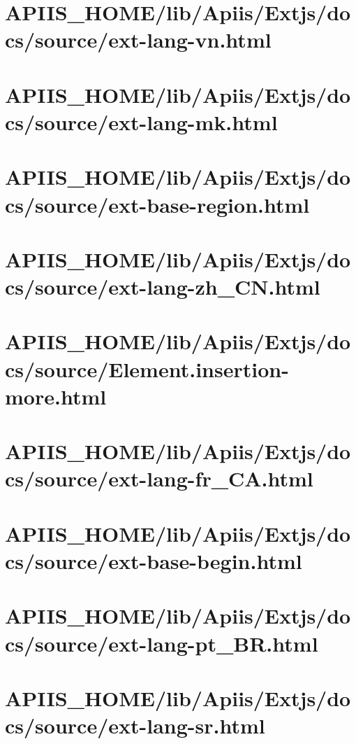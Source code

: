 \section{APIIS\_HOME/lib/Apiis/Extjs/docs/source/ext-lang-vn.html} 
\section{APIIS\_HOME/lib/Apiis/Extjs/docs/source/ext-lang-mk.html} 
\section{APIIS\_HOME/lib/Apiis/Extjs/docs/source/ext-base-region.html} 
\section{APIIS\_HOME/lib/Apiis/Extjs/docs/source/ext-lang-zh\_CN.html} 
\section{APIIS\_HOME/lib/Apiis/Extjs/docs/source/Element.insertion-more.html} 
\section{APIIS\_HOME/lib/Apiis/Extjs/docs/source/ext-lang-fr\_CA.html} 
\section{APIIS\_HOME/lib/Apiis/Extjs/docs/source/ext-base-begin.html} 
\section{APIIS\_HOME/lib/Apiis/Extjs/docs/source/ext-lang-pt\_BR.html} 
\section{APIIS\_HOME/lib/Apiis/Extjs/docs/source/ext-lang-sr.html} 
